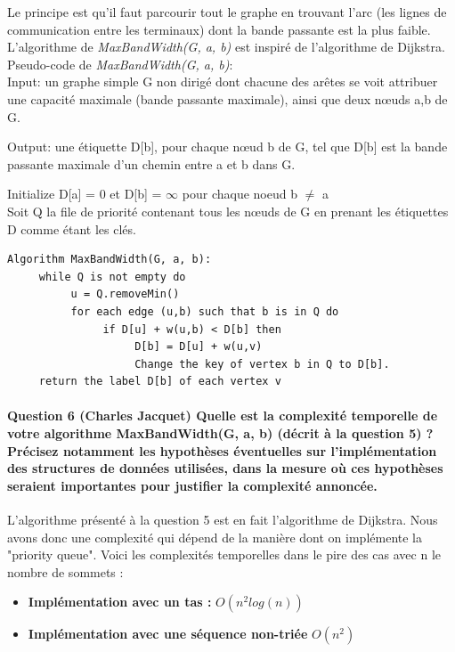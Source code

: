\documentclass[a4paper]{article}
\begin{document}
Le principe est qu'il faut parcourir tout le graphe en trouvant l'arc (les lignes de communication entre les terminaux) dont la bande passante est la plus faible. L'algorithme de \textit{MaxBandWidth(G, a, b)} est inspiré de l'algorithme de Dijkstra.\\

Pseudo-code de \textit{MaxBandWidth(G, a, b)}:\\
     Input: un graphe simple G non dirigé dont chacune des arêtes se voit attribuer une capacité maximale (bande passante maximale), ainsi que deux nœuds a,b de G.
	 
     Output: une étiquette D[b], pour chaque nœud b de G, tel que D[b] est la bande passante maximale d’un chemin entre a et b dans G.
      
      Initialize D[a] = 0 et D[b] =  $\infty$ pour chaque noeud b $\neq$ a\\
      Soit Q la file de priorité contenant tous les nœuds de G en prenant les étiquettes D comme étant les clés.
\begin{verbatim}
Algorithm MaxBandWidth(G, a, b):
     while Q is not empty do
          u = Q.removeMin()
          for each edge (u,b) such that b is in Q do
               if D[u] + w(u,b) < D[b] then
                    D[b] = D[u] + w(u,v)
                    Change the key of vertex b in Q to D[b].
     return the label D[b] of each vertex v
\end{verbatim}




\paragraph{Question 6 (Charles Jacquet) Quelle est la complexité temporelle de votre algorithme MaxBandWidth(G, a, b) (décrit à la question 5) ? Précisez notamment les hypothèses éventuelles sur l’implémentation des structures de données utilisées, dans la mesure où ces hypothèses seraient importantes pour justifier la complexité annoncée.}
L'algorithme présenté à la question 5 est en fait l'algorithme de Dijkstra. Nous avons donc une complexité qui dépend de la manière dont on implémente la "priority queue". Voici les complexités temporelles dans le pire des cas avec n le nombre de sommets : \\
\begin{itemize}
\item \textbf{Implémentation avec un tas : } $O(n^2 log(n))$
\item \textbf{Implémentation avec une séquence non-triée} $O(n^2)$
\end{itemize}
\end{document}
